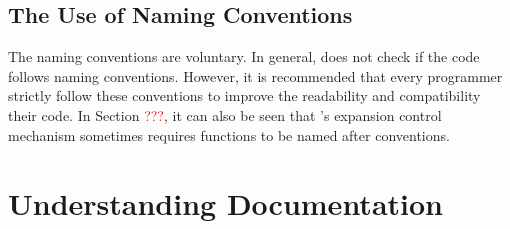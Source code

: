 \documentclass{ltugboat}
\begin{document}

\subsection{The Use of \LTT{} Naming Conventions}

The \LTT{} naming conventions are voluntary. 
In general, \LTT{} does not check if the code follows \LTT{} naming conventions.
However, it is recommended that every \LTT{} programmer strictly follow these conventions to improve the readability and compatibility their code.
In Section \textcolor{red}{???}, it can also be seen that \LTT{}'s expansion control mechanism sometimes requires functions to be named after \LTT{} conventions.


\section{Understanding \LTT{} Documentation}
\end{document}
